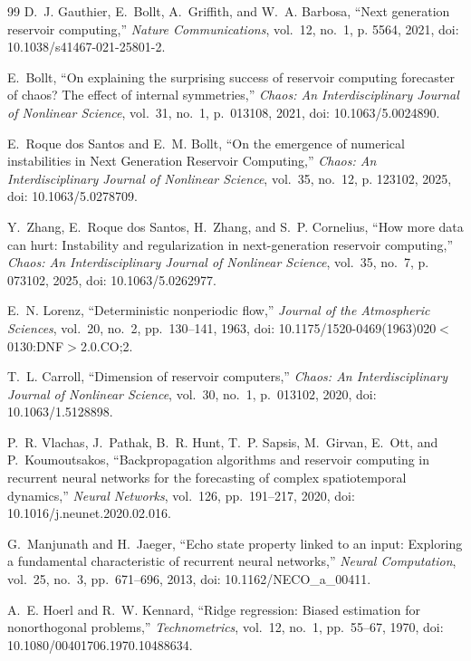 \documentclass[aip,cha,reprint,amsmath,amssymb]{revtex4-2}
\begin{document}
\begin{thebibliography}{99}
D.~J. Gauthier, E.~Bollt, A.~Griffith, and W.~A. Barbosa, ``Next generation reservoir computing,'' \emph{Nature Communications}, vol.~12, no.~1, p. 5564, 2021, doi: 10.1038/s41467-021-25801-2.

E.~Bollt, ``On explaining the surprising success of reservoir computing forecaster of chaos? The effect of internal symmetries,'' \emph{Chaos: An Interdisciplinary Journal of Nonlinear Science}, vol.~31, no.~1, p.~013108, 2021, doi: 10.1063/5.0024890.

E.~Roque dos Santos and E.~M. Bollt, ``On the emergence of numerical instabilities in Next Generation Reservoir Computing,'' \emph{Chaos: An Interdisciplinary Journal of Nonlinear Science}, vol.~35, no.~12, p. 123102, 2025, doi: 10.1063/5.0278709.

Y.~Zhang, E.~Roque dos Santos, H.~Zhang, and S.~P. Cornelius, ``How more data can hurt: Instability and regularization in next-generation reservoir computing,'' \emph{Chaos: An Interdisciplinary Journal of Nonlinear Science}, vol.~35, no.~7, p. 073102, 2025, doi: 10.1063/5.0262977.

E.~N. Lorenz, ``Deterministic nonperiodic flow,'' \emph{Journal of the Atmospheric Sciences}, vol.~20, no.~2, pp.~130--141, 1963, doi: 10.1175/1520-0469(1963)020$<$0130:DNF$>$2.0.CO;2.

T.~L. Carroll, ``Dimension of reservoir computers,'' \emph{Chaos: An Interdisciplinary Journal of Nonlinear Science}, vol.~30, no.~1, p.~013102, 2020, doi: 10.1063/1.5128898.

P.~R. Vlachas, J.~Pathak, B.~R. Hunt, T.~P. Sapsis, M.~Girvan, E.~Ott, and P.~Koumoutsakos, ``Backpropagation algorithms and reservoir computing in recurrent neural networks for the forecasting of complex spatiotemporal dynamics,'' \emph{Neural Networks}, vol.~126, pp.~191--217, 2020, doi: 10.1016/j.neunet.2020.02.016.

G.~Manjunath and H.~Jaeger, ``Echo state property linked to an input: Exploring a fundamental characteristic of recurrent neural networks,'' \emph{Neural Computation}, vol.~25, no.~3, pp.~671--696, 2013, doi: 10.1162/NECO\_a\_00411.

A.~E. Hoerl and R.~W. Kennard, ``Ridge regression: Biased estimation for nonorthogonal problems,'' \emph{Technometrics}, vol.~12, no.~1, pp.~55--67, 1970, doi: 10.1080/00401706.1970.10488634.


\end{thebibliography}
\end{document}
